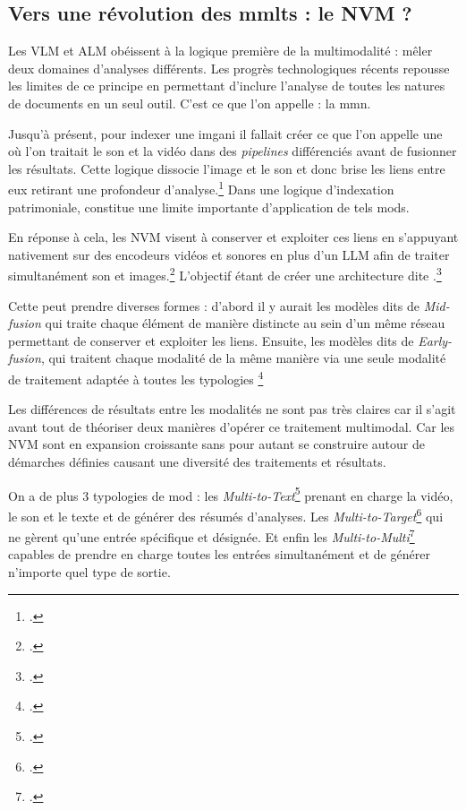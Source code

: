 \subsection{Vers une révolution des \gls{mmlts} : le \gls{NVM} ?}
\label{revNVM}

Les \gls{VLM} et \gls{ALM} obéissent à la logique première de la multimodalité : mêler deux domaines d'analyses différents. Les progrès technologiques récents repousse les limites de ce principe en permettant d'inclure l'analyse de toutes les natures de documents en un seul outil. C'est ce que l'on appelle : la \gls{mmn}.\newline

Jusqu'à présent, pour indexer une \gls{imgani} il fallait créer ce que l'on appelle une  où l'on traitait le son et la vidéo dans des \textit{pipelines} différenciés avant de fusionner les résultats. Cette logique dissocie l'image et le son et donc brise les liens entre eux retirant une profondeur d'analyse.\footcite[p.1]{anNativeMultimodalModeling2026} Dans une logique d'indexation patrimoniale, constitue une limite importante d'application de tels \glspl{mod}.

En réponse à cela, les \gls{NVM} visent à conserver et exploiter ces liens en s'appuyant nativement sur des encodeurs vidéos et sonores en plus d'un \gls{LLM} afin de traiter simultanément son et images.\footcite[p.1]{anNativeMultimodalModeling2026} L'objectif étant de créer une architecture dite .\footcite[p.1]{anNativeMultimodalModeling2026}

Cette  peut prendre diverses formes : d'abord il y aurait les modèles dits de \textit{Mid-fusion} qui traite chaque élément de manière distincte au sein d'un même réseau permettant de conserver et exploiter les liens. Ensuite, les modèles dits de \textit{Early-fusion}, qui traitent chaque modalité de la même manière via une seule modalité de traitement adaptée à toutes les typologies \footcite[p.1 à 5]{anNativeMultimodalModeling2026}

Les différences de résultats entre les modalités ne sont pas très claires car il s'agit avant tout de théoriser deux manières d'opérer ce traitement multimodal. Car les \gls{NVM} sont en expansion croissante sans pour autant se construire autour de démarches définies causant une diversité des traitements et résultats.

On a de plus 3 typologies de \gls{mod} : les \textit{Multi-to-Text}\footcite[p.3 à 9]{anNativeMultimodalModeling2026} prenant en charge la vidéo, le son et le texte et de générer des résumés d'analyses. Les \textit{Multi-to-Target}\footcite[p.10 à 12]{anNativeMultimodalModeling2026} qui ne gèrent qu'une entrée spécifique et désignée. Et enfin les \textit{Multi-to-Multi}\footcite[p.12 à 14]{anNativeMultimodalModeling2026} capables de prendre en charge toutes les entrées simultanément et de générer n'importe quel type de sortie.

